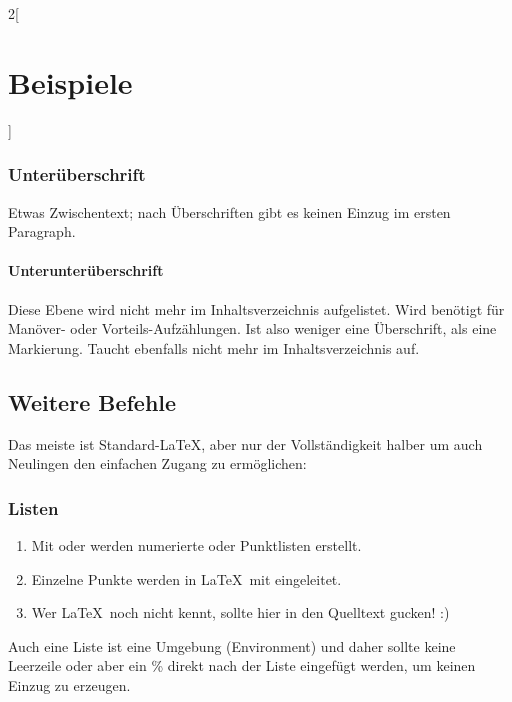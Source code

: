 \documentclass[linksbund]{rpg-ilaris}
\begin{document}
\begin{multicols}{2}[        %
		\chapter{Beispiele}  %
		]
	\subsection{Unterüberschrift}
	Etwas Zwischentext; nach Überschriften gibt es keinen Einzug im ersten Paragraph.
	\subsubsection{Unterunterüberschrift}
	Diese Ebene wird nicht mehr im Inhaltsverzeichnis aufgelistet.
	Wird benötigt für Manöver- oder Vorteils-Aufzählungen. Ist also weniger eine Überschrift, als eine Markierung. Taucht ebenfalls nicht mehr im Inhaltsverzeichnis auf.

\section{Weitere Befehle}
Das meiste ist Standard-\LaTeX, aber nur der Vollständigkeit halber um auch Neulingen den einfachen Zugang zu ermöglichen:
\subsection{Listen}
\begin{enumerate}
	\item Mit  oder  werden numerierte oder Punktlisten erstellt.
	\item Einzelne Punkte werden in \LaTeX\ mit  eingeleitet.
	\item Wer \LaTeX\ noch nicht kennt, sollte hier in den Quelltext gucken! :)
\end{enumerate}

Auch eine Liste ist eine Umgebung (Environment) und daher sollte keine Leerzeile oder aber ein \% direkt nach der Liste eingefügt werden, um keinen Einzug zu erzeugen.




\end{multicols}
\end{document}
